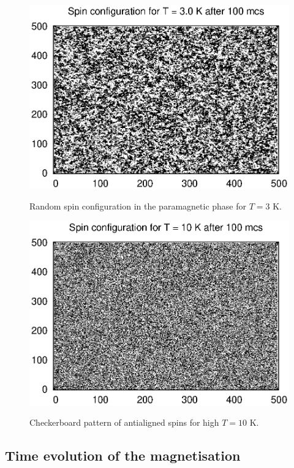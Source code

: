 \documentclass[a4paper]{article}
\begin{document}
\vspace{3mm}

\begin{figure}[h]
\centering
\begin{minipage}[b]{0.45\linewidth}
\includegraphics[width=1\textwidth]{warm.eps}
\label{fig:minipage1}
\caption{Random spin configuration in the paramagnetic phase for $T = 3$ K.}
\end{minipage}
\quad
\begin{minipage}[b]{0.45\linewidth}
\includegraphics[width=1\textwidth]{hot.eps}
\label{fig:minipage2}
\caption{Checkerboard pattern of antialigned spins for high $T = 10$ K.}
\end{minipage}
\end{figure}

\subsection{Time evolution of the magnetisation}
\end{document}

